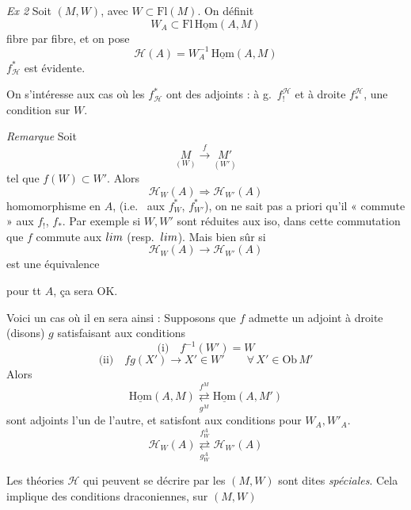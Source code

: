 \documentclass[11pt,a4paper]{article}
\begin{document}
\emph{Ex 2} \quad Soit $(M, W)$, avec $W \subset \mathrm{Fl}(M)$. On
définit
\[
  W_A \subset \mathrm{Fl}\,\underline{\mathrm{Hom}}(A, M)
\]
\struck{\ill{}} \ill{} fibre par fibre, et on pose
\[
  \mathcal H(A) = W_A^{-1}\, \underline{\mathrm{Hom}}(A, M)
\]
 $f^{*}_{\mathcal H}$ est évidente.

On s'intéresse aux cas où les $f^{*}_{\mathcal H}$ ont des adjoints : à
g.\ $f^{\mathcal H}_{!}$ et à droite $f^{\mathcal H}_{*}$, une condition sur
$W$.

\emph{Remarque} \quad Soit
\[
  \underset{(W)}{M} \xrightarrow{\ f\ } \underset{(W')}{M'}
\]
tel que $f(W) \subset W'$. Alors
\[
  \mathcal H_W(A) \Longrightarrow \mathcal H_{W'}(A)
\]
homomorphisme  en $A$, (i.e.\ 
aux $f^{*}_{W}$, $f^{*}_{W'}$), on ne sait  pas a priori
qu'il « commute » \ill{} aux $f_!$, $f_*$. Par exemple si $W, W'$ sont
réduites aux iso, dans \ill{} cette commutation 
\ill{}  que $f$ commute aux
$\varinjlim$ (resp.\ $\varprojlim$). Mais bien sûr si
\[
  \mathcal H_W(A) \to \mathcal H_{W'}(A)
\]
est une équivalence

pour tt $A$, ça sera OK.

Voici un cas où il en sera ainsi : Supposons que $f$ admette un adjoint à
droite (disons) $g$ satisfaisant aux conditions
\[
  \text{(i)} \quad f^{-1}(W') = W
\]
\[
  \text{(ii)} \quad fg(X') \to X' \in W' \qquad \forall\, X' \in \mathrm{Ob}\, M'
\]
Alors
\[
  \underline{\mathrm{Hom}}(A, M)
  \underset{g^{M}}{\overset{f^{M}}{\rightleftarrows}}
  \underline{\mathrm{Hom}}(A, M')
\]
sont adjoints l'un de l'autre, et  \ill{} satisfont aux
 conditions pour $W_A, W'_A$. 
\[
  \mathcal H_W(A)
  \underset{g^{A}_{W}}{\overset{f^{A}_{W}}{\rightleftarrows}}
  \mathcal H_{W'}(A)
\]
\struck{\ill{}}

Les théories $\mathcal H$ qui peuvent se décrire par les $(M, W)$ sont
dites \emph{spéciales}. Cela implique des conditions draconiennes, sur
$(M, W)$
\end{document}
